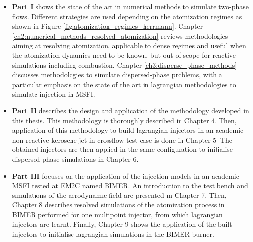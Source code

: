 \begin{itemize}

	\item \textbf{Part I} shows the state of the art in numerical methods to simulate two-phase flows. Different strategies are used depending on the atomization regimes as shown in Figure \ref{fig:atomization_regimes_herrmann}. Chapter \ref{ch2:numerical_methods_resolved_atomization} reviews methodologies aiming at resolving atomization, applicable to dense regimes and useful when the atomization dynamics need to be known, but out of scope for reactive simulations including combustion. Chapter \ref{ch3:disperse_phase_methods} discusses methodologies to simulate dispersed-phase problems, with a particular emphasis on the state of the art in lagrangian methodologies to simulate injection in MSFI.
	
	\item \textbf{Part II} describes the design and application of the methodology developed in this thesis. This methodology is thoroughly described in Chapter 4. Then, application of this methodology to build lagrangian injectors in an academic non-reactive kerosene jet in crossflow test case is done in Chapter 5. The obtained injectors are then applied in the same configuration to initialise dispersed phase simulations in Chapter 6.
	
	\item \textbf{Part III} focuses on the application of the injection models in an academic MSFI tested at EM2C named BIMER. An introduction to the test bench and simulations of the aerodynamic field are presented in Chapter 7. Then, Chapter 8 describes resolved simulations of the atomization process in BIMER performed for one multipoint injector, from which lagrangian injectors are learnt. Finally, Chapter 9 shows the application of the built injectors to initialise lagrangian simulations in the BIMER burner.


\end{itemize}
